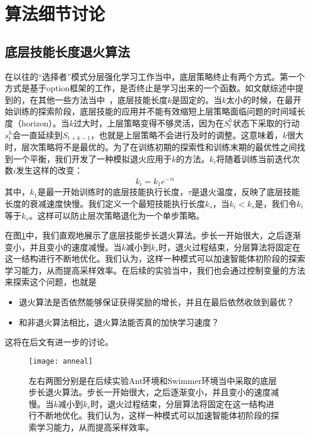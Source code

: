 \section{算法细节讨论}
\subsection{底层技能长度退火算法}
在以往的``选择者''模式分层强化学习工作当中，底层策略终止有两个方式。第一个方式是基于option框架的工作，是否终止是学习出来的一个函数。如文献综述中提到的，在其他一些方法当中~\cite{SNN4hrl, MLSH,HAC}，底层技能长度$k$是固定的。当$k$太小的时候，在最开始训练的探索阶段，底层技能的应用并不能有效缩短上层策略面临问题的时间域长度（horizon）。当$k$过大时，上层策略变得不够灵活，因为在$S_t^h$状态下采取的行动$s_t^h$会一直延续到$S_{t+k-1}$，也就是上层策略不会进行及时的调整。这意味着，$k$很大时，层次策略将不是最优的。为了在训练初期的探索性和训练末期的最优性之间找到一个平衡，我们开发了一种模拟退火应用于$k$的方法。$k_i$将随着训练当前迭代次数$i$发生这样的改变：
    $$k_i=k_1 e^{-\tau i}$$
	其中，$k_1$是最一开始训练时的底层技能执行长度，$\tau$是退火温度，反映了底层技能长度的衰减速度快慢。我们定义一个最短技能执行长度$k_s$，当$k_i < k_s$是，我们令$k_i$等于$k_s$。这样可以防止层次策略退化为一个单步策略。
	
	在图\ref{fig:anneal}中，我们直观地展示了底层技能步长退火算法。步长一开始很大，之后逐渐变小，并且变小的速度减慢。当$k$减小到$k_s$时，退火过程结束，分层算法将固定在这一结构进行不断地优化。我们认为，这样一种模式可以加速智能体初阶段的探索学习能力，从而提高采样效率。在后续的实验当中，我们也会通过控制变量的方法来探索这个问题，也就是
	\begin{itemize}
	  \item 退火算法是否依然能够保证获得奖励的增长，并且在最后依然收敛到最优？
	  \item 和非退火算法相比，退火算法能否真的加快学习速度？
	\end{itemize}
	这将在后文有进一步的讨论。
	
	\begin{figure}[h] %
        \centering
        \texttt{[image: anneal]}
        \caption{左右两图分别是在后续实验Ant环境和Swimmer环境当中采取的底层步长退火算法。步长一开始很大，之后逐渐变小，并且变小的速度减慢。当$k$减小到$k_s$时，退火过程结束，分层算法将固定在这一结构进行不断地优化。我们认为，这样一种模式可以加速智能体初阶段的探索学习能力，从而提高采样效率。}
        \label{fig:anneal}
    \end{figure}
	
